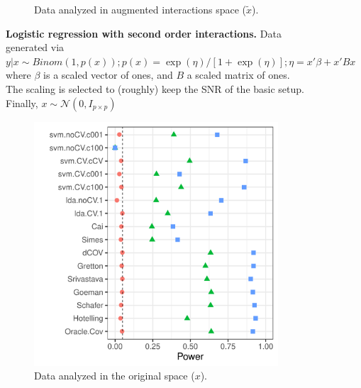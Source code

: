 \documentclass[]{bio}
\begin{document}
\begin{figure}[th]
\begin{subfigure}[t]{.45\columnwidth}
		\caption{Data analyzed in augmented interactions space ($\tilde x$).}
		\label{fig:interactions-in-augmented-space}
	\end{subfigure}
	\caption{\textbf{Logistic regression with second order interactions.} 
		Data generated via $y|x \sim Binom(1,p(x));
		p(x)=\exp(\eta)/[1+\exp(\eta)];
		\eta=x'\beta+x'Bx$ where 
		$\beta$ is a scaled vector of ones, and $B$ a scaled matrix of ones.
		The scaling is selected to (roughly) keep the SNR of the basic setup. 
		Finally, $x\sim \mathcal{N}(0,I_{p\times p})$ } 
	\label{fig:logistic-main-and-interactions}
\end{figure}





\begin{figure}[th]
	\centering
	\begin{subfigure}[t]{.45\columnwidth}
		\centering
		\includegraphics[width=1\columnwidth]{"art/file40"}
		\caption{Data analyzed in the original space ($x$).}
		\label{fig:main-only-original-space}
	\end{subfigure}
	\begin{subfigure}[t]{.45\columnwidth}
		\centering

\end{subfigure}
\end{figure}
\end{document}
